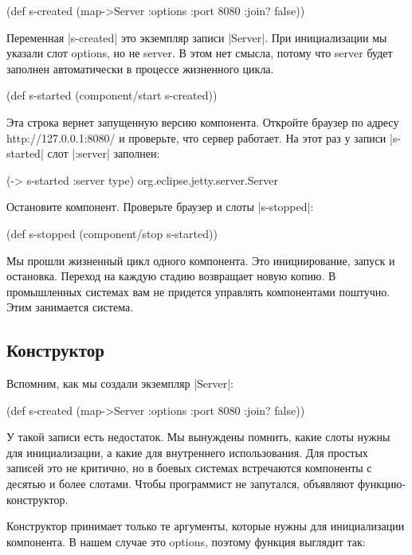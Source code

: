 \begin{code}
(def s-created
  (map->Server
   {:options {:port 8080 :join? false}}))
\end{code}

Переменная \spverb|s-created| это экземпляр записи \spverb|Server|. При инициализации мы
указали слот options, но не server. В этом нет смысла, потому что server будет
заполнен автоматически в процессе жизненного цикла.

\begin{code}
(def s-started (component/start s-created))
\end{code}

Эта строка вернет запущенную версию компонента. Откройте браузер по адресу
http://127.0.0.1:8080/ и проверьте, что сервер работает. На этот раз у записи
\spverb|s-started| слот \spverb|:server| заполнен:

\begin{code}
(-> s-started :server type)
org.eclipse.jetty.server.Server
\end{code}

Остановите компонент. Проверьте браузер и слоты \spverb|s-stopped|:

\begin{code}
(def s-stopped (component/stop s-started))
\end{code}

Мы прошли жизненный цикл одного компонента. Это инициирование, запуск и
остановка. Переход на каждую стадию возвращает новую копию. В промышленных
системах вам не придется управлять компонентами поштучно. Этим занимается
система.

\subsection{Конструктор}

Вспомним, как мы создали экземпляр \spverb|Server|:

\begin{code}
(def s-created
  (map->Server
   {:options {:port 8080 :join? false}}))
\end{code}

У такой записи есть недостаток. Мы вынуждены помнить, какие слоты нужны для
инициализации, а какие для внутреннего использования. Для простых записей это не
критично, но в боевых системах встречаются компоненты с десятью и более
слотами. Чтобы программист не запутался, объявляют функцию-конструктор.

Конструктор принимает только те аргументы, которые нужны для инициализации
компонента. В нашем случае это options, поэтому функция выглядит так:

